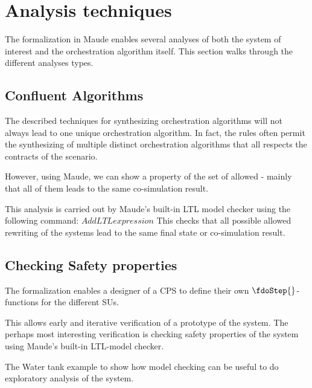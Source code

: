 \section{Analysis techniques}\label{sc:casestudy}
The formalization in Maude enables several analyses of both the system of interest and the orchestration algorithm itself. 
This section walks through the different analyses types.

\subsection{Confluent Algorithms}
The described techniques for synthesizing orchestration algorithms will not always lead to one unique orchestration algorithm.
In fact, the rules often permit the synthesizing of multiple distinct orchestration algorithms that all respects the contracts of the scenario.

However, using Maude, we can show a property of the set of allowed - mainly that all of them leads to the same co-simulation result.

This analysis is carried out by Maude's built-in LTL model checker using the following command:
$Add LTL expression$
This checks that all possible allowed rewriting of the systems lead to the same final state or co-simulation result.

\subsection{Checking Safety properties}
The formalization enables a designer of a CPS to define their own $\fdoStep{}$-functions for the different SUs.  

This allows early and iterative verification of a prototype of the system. 
The perhaps most interesting verification is checking safety properties of the system using Maude's built-in LTL-model checker. 

The Water tank example to show how model checking can be useful to do exploratory analysis of the system.
